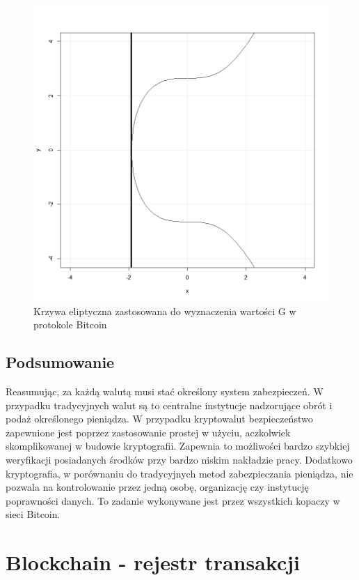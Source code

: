 \documentclass[12pt, twoside, final, openany]{mgr}
\begin{document}
\newpage
\vfill
\begin{figure}[!h]
\centering
\includegraphics[width=0.9\linewidth]{pictures/elliptic.png}
\caption{Krzywa eliptyczna zastosowana do wyznaczenia wartości G w protokole Bitcoin}
\label{fig:krzywaEliptyczna}
\end{figure}

\section{Podsumowanie} \label{sec:podsumowanieKryptowaluty}
\indent Reasumując, za każdą walutą musi stać określony system zabezpieczeń. W przypadku tradycyjnych walut są to centralne instytucje nadzorujące obrót i podaż określonego pieniądza. W przypadku kryptowalut bezpieczeństwo zapewnione jest poprzez zastosowanie prostej w użyciu, aczkolwiek skomplikowanej w budowie kryptografii. Zapewnia to możliwości bardzo szybkiej weryfikacji posiadanych środków przy bardzo niskim nakładzie pracy. Dodatkowo kryptografia, w porównaniu do tradycyjnych metod zabezpieczania pieniądza, nie pozwala na kontrolowanie przez jedną osobę, organizację czy instytucję poprawności danych. To zadanie wykonywane jest przez wszystkich kopaczy w sieci Bitcoin. 


\chapter{Blockchain - rejestr transakcji}
\label{blockchain}
\end{document}
